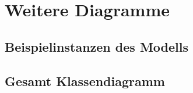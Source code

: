 
\section{Weitere Diagramme}	
\hypertarget{ModelExample}{}
\subsection{Beispielinstanzen des Modells}

\begin{center}
\end{center}

\subsection{Gesamt Klassendiagramm}


	